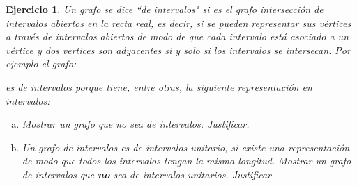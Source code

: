 \documentclass[a4paper,oneside,12pt]{amsart}
\newtheorem{quest}{Ejercicio}
\begin{document}
\begin{quest} 
Un grafo se dice ``de intervalos" si es el grafo intersección de intervalos abiertos en la recta real, es decir, si se pueden representar sus vértices a través de intervalos abiertos de modo de que cada intervalo está asociado a un vértice y dos vertices son adyacentes si y solo si los intervalos se intersecan. Por ejemplo el grafo:

\begin{center}
\end{center}

es de intervalos porque tiene, entre otras, la siguiente representación en intervalos:

\begin{center}
\end{center}

\begin{enumerate}[(a)]
    \item Mostrar un grafo que no sea de intervalos. Justificar.
    
    \item Un grafo de intervalos es de intervalos unitario, si existe una representación de modo que todos los intervalos tengan la misma longitud. 
    Mostrar un grafo de intervalos que \textbf{no} sea de intervalos unitarios. Justificar.
\end{enumerate}

\end{quest}
\end{document}
